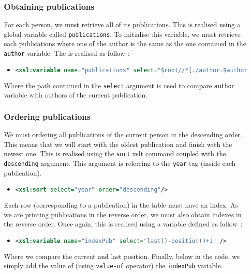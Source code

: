\documentclass{article}
\begin{document}
    \subsubsection{Obtaining publications}
      For each person, we must retrieve all of its publications. This is realised using a global variable called \verb|publications|. To initialise this variable, we must retrieve each publications where one of the author is the same as the one contained in the \verb|author| variable. The is realised as follow :
      \begin{itemize}
	\item \begin{lstlisting}[language=XML]
<xsl:variable name="publications" select="$root//*[./author=$author]" />\end{lstlisting}
      \end{itemize}
      Where the path contained in the \verb|select| argument is used to compare \verb|author| variable with authors of the current publication.
      
    \subsubsection{Ordering publications}
      We must ordering all publications of the current person in the descending order. This means that we will start with the oldest publication and finish with the newest one. This is realised using the \verb|sort| xslt command coupled with the \verb|descending| argument. This argument is referring to the \verb|year| tag (inside each publication).
      \begin{itemize}
	\item \begin{lstlisting}[language=XML]
<xsl:sort select="year" order="descending"/>\end{lstlisting}
      \end{itemize}
      Each row (corresponding to a publication) in the table must have an index. As we are printing publications in the reverse order, we must also obtain indexes in the reverse order. Once again, this is realised using a variable defined as follow~:
      \begin{itemize}
	\item \begin{lstlisting}[language=XML]
<xsl:variable name="indexPub" select="last()-position()+1" />\end{lstlisting}
      \end{itemize}
      Where we compare the current and last position. Finally, below in the code, we simply add the value of (using \verb|value-of| operator) the \verb|indexPub| variable. 
      
\end{document}
